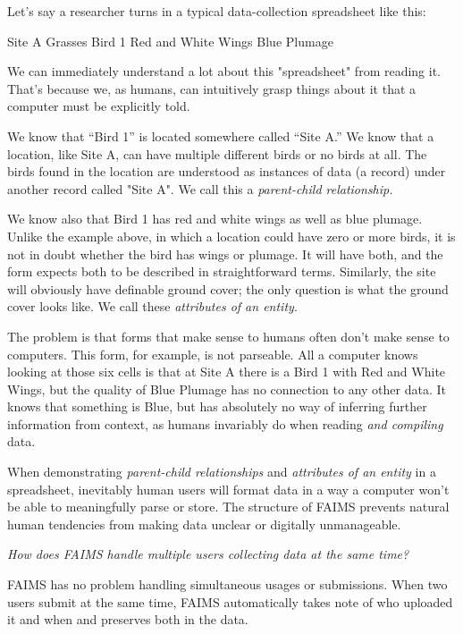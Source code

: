 Let's say a researcher turns in a typical data-collection spreadsheet like this:

\placetable[none]{}
\starttable[|l|l|l|l|]
\HL
{}
\NC\AR
\HL
\NC Site A
\NC Grasses
\NC Bird 1
\NC Red and White Wings
\NC\AR
\NC 
\NC 
\NC 
\NC Blue Plumage
\NC\AR
\HL
\stoptable

We can immediately understand a lot about this "spreadsheet" from reading it. That's because we, as humans, can intuitively grasp things about it that a computer must be explicitly told.

We know that “Bird 1” is located somewhere called “Site A.” We know that a location, like Site A, can have multiple different birds or no birds at all. The birds found in the location are understood as instances of data (a record) under another record called "Site A". We call this a {\em parent-child relationship.}

We know also that Bird 1 has red and white wings as well as blue plumage. Unlike the example above, in which a location could have zero or more birds, it is not in doubt whether the bird has wings or plumage. It will have both, and the form expects both to be described in straightforward terms. Similarly, the site will obviously have definable ground cover; the only question is what the ground cover looks like. We call these {\em attributes of an entity}.

The problem is that forms that make sense to humans often don't make sense to computers. This form, for example, is not parseable. All a computer knows looking at those six cells is that at Site A there is a Bird 1 with Red and White Wings, but the quality of Blue Plumage has no connection to any other data. It knows that something is Blue, but has absolutely no way of inferring further information from context, as humans invariably do when reading {\em and compiling} data.

When demonstrating {\em parent-child relationships} and {\em attributes of an entity} in a spreadsheet, inevitably human users will format data in a way a computer won't be able to meaningfully parse or store. The structure of FAIMS prevents natural human tendencies from making data unclear or digitally unmanageable.

{\em How does FAIMS handle multiple users collecting data at the same time?}

FAIMS has no problem handling simultaneous usages or submissions. When two users submit at the same time, FAIMS automatically takes note of who uploaded it and when and preserves both in the data.

